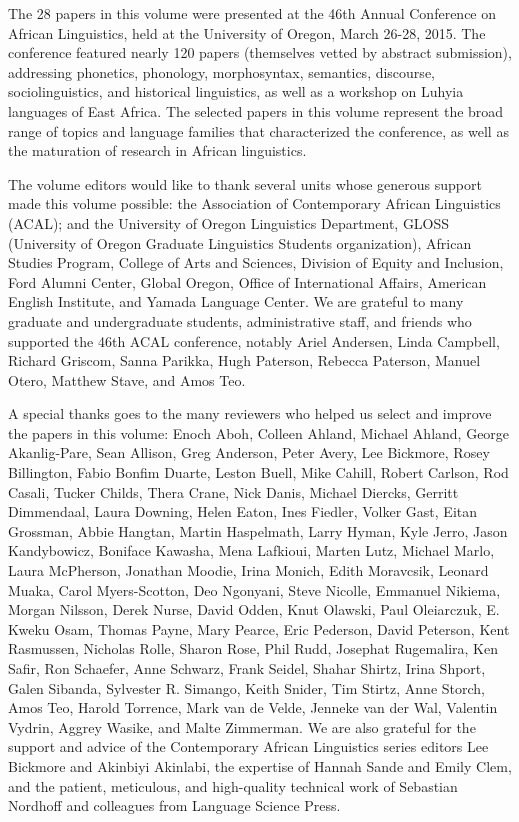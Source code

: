 \largerpage
The 28 papers in this volume were presented at the 46th Annual Conference on African Linguistics, held at the University of Oregon, March 26-28, 2015. The conference featured nearly 120 papers (themselves vetted by abstract submission), addressing phonetics, phonology, morphosyntax, semantics, discourse, sociolinguistics, and historical linguistics, as well as a workshop on Luhyia languages of East Africa. The selected papers in this volume represent the broad range of topics and language families that characterized the conference, as well as the maturation of research in African linguistics.

The volume editors would like to thank several units whose generous support made this volume possible: the Association of Contemporary African Linguistics (ACAL); 
and the University of Oregon Linguistics Department, 
 GLOSS (University of Oregon Graduate Linguistics Students organization), 
 African Studies Program, 
 College of Arts and Sciences, 
 Division of Equity and Inclusion, 
 Ford Alumni Center, 
 Global Oregon, 
 Office of International Affairs,
 American English Institute, 
 and Yamada Language Center.
We are grateful to many graduate and undergraduate students, administrative staff, and friends who supported the 46th ACAL conference, notably 
  Ariel Andersen, 
  Linda Campbell, 
  Richard Griscom, 
  Sanna Parikka, 
  Hugh Paterson, 
  Rebecca Paterson, 
  Manuel Otero, 
  Matthew Stave, 
  and Amos Teo.

A special thanks goes to the many reviewers who helped us select and improve the papers in this volume: 
Enoch Aboh,
Colleen Ahland,
Michael Ahland,
George Akanlig-Pare,
Sean Allison,
Greg Anderson,
Peter Avery,
Lee Bickmore,
Rosey Billington,
Fabio Bonfim Duarte,
Leston Buell,
Mike Cahill,
Robert Carlson,
Rod Casali,
Tucker Childs,
Thera Crane,
Nick Danis,
Michael Diercks,
Gerritt Dimmendaal,
Laura Downing,
Helen Eaton,
Ines Fiedler,
Volker Gast,
Eitan Grossman,
Abbie Hangtan,
Martin Haspelmath,
Larry Hyman,
Kyle Jerro,
Jason Kandybowicz,
Boniface Kawasha,
Mena Lafkioui,
Marten Lutz,
Michael Marlo,
Laura McPherson,
Jonathan Moodie,
Irina Monich,
Edith Moravcsik,
Leonard Muaka,
Carol Myers-Scotton,
Deo Ngonyani,
Steve Nicolle,
Emmanuel Nikiema,
Morgan Nilsson,
Derek Nurse,
David Odden,
Knut Olawski,
Paul Oleiarczuk,
E. Kweku Osam,
Thomas Payne,
Mary Pearce,
Eric Pederson,
David Peterson,
Kent Rasmussen,
Nicholas Rolle,
Sharon Rose,
Phil Rudd,
Josephat Rugemalira,
Ken Safir,
Ron Schaefer,
Anne Schwarz,
Frank Seidel,
Shahar Shirtz,
Irina Shport,
Galen Sibanda,
Sylvester R. Simango,
Keith Snider,
Tim Stirtz,
Anne Storch,
Amos Teo,
Harold Torrence,
Mark van de Velde,
Jenneke van der Wal,
Valentin Vydrin,
Aggrey Wasike,
and Malte Zimmerman.
 We are also grateful for the support and advice of the Contemporary African Linguistics series editors Lee Bickmore and Akinbiyi Akinlabi, the expertise of Hannah Sande and Emily Clem, and the patient, meticulous, and high-quality technical work of Sebastian Nordhoff and colleagues from Language Science Press. 